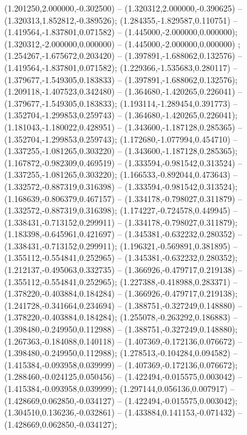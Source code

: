  (1.201250,2.000000,-0.302500) -- (1.320312,2.000000,-0.390625) -- (1.320313,1.852812,-0.389526);
 (1.284355,-1.829587,0.110751) -- (1.419564,-1.837801,0.071582) -- (1.445000,-2.000000,0.000000);
 (1.320312,-2.000000,0.000000) -- (1.445000,-2.000000,0.000000) ;
 (1.254267,-1.675672,0.203420) -- (1.397891,-1.688062,0.132576) -- (1.419564,-1.837801,0.071582);
 (1.229366,-1.535683,0.280117) -- (1.379677,-1.549305,0.183833) -- (1.397891,-1.688062,0.132576);
 (1.209118,-1.407523,0.342480) -- (1.364680,-1.420265,0.226041) -- (1.379677,-1.549305,0.183833);
 (1.193114,-1.289454,0.391773) -- (1.352704,-1.299853,0.259743) -- (1.364680,-1.420265,0.226041);
 (1.181043,-1.180022,0.428951) -- (1.343600,-1.187128,0.285365) -- (1.352704,-1.299853,0.259743);
 (1.172680,-1.077994,0.454710) -- (1.337255,-1.081265,0.303220) -- (1.343600,-1.187128,0.285365);
 (1.167872,-0.982309,0.469519) -- (1.333594,-0.981542,0.313524) -- (1.337255,-1.081265,0.303220);
 (1.166533,-0.892044,0.473643) -- (1.332572,-0.887319,0.316398) -- (1.333594,-0.981542,0.313524);
 (1.168639,-0.806379,0.467157) -- (1.334178,-0.798027,0.311879) -- (1.332572,-0.887319,0.316398);
 (1.174227,-0.724578,0.449945) -- (1.338431,-0.713152,0.299911) -- (1.334178,-0.798027,0.311879);
 (1.183398,-0.645961,0.421697) -- (1.345381,-0.632232,0.280352) -- (1.338431,-0.713152,0.299911);
 (1.196321,-0.569891,0.381895) -- (1.355112,-0.554841,0.252965) -- (1.345381,-0.632232,0.280352);
 (1.212137,-0.495063,0.332735) -- (1.366926,-0.479717,0.219138) -- (1.355112,-0.554841,0.252965);
 (1.227388,-0.418988,0.283371) -- (1.378220,-0.403884,0.184284) -- (1.366926,-0.479717,0.219138);
 (1.241728,-0.341664,0.234694) -- (1.388751,-0.327249,0.148880) -- (1.378220,-0.403884,0.184284);
 (1.255078,-0.263292,0.186883) -- (1.398480,-0.249950,0.112988) -- (1.388751,-0.327249,0.148880);
 (1.267363,-0.184088,0.140118) -- (1.407369,-0.172136,0.076672) -- (1.398480,-0.249950,0.112988);
 (1.278513,-0.104284,0.094582) -- (1.415384,-0.093958,0.039999) -- (1.407369,-0.172136,0.076672);
 (1.288460,-0.024125,0.050456) -- (1.422494,-0.015575,0.003042) -- (1.415384,-0.093958,0.039999);
 (1.297144,0.056136,0.007917) -- (1.428669,0.062850,-0.034127) -- (1.422494,-0.015575,0.003042);
 (1.304510,0.136236,-0.032861) -- (1.433884,0.141153,-0.071432) -- (1.428669,0.062850,-0.034127);
